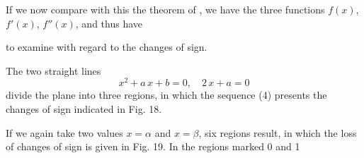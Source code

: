 If we now compare with this the theorem of , we have the three functions $f(x)$, $f'(x)$, $f''(x)$, and thus have


to examine with regard to the changes of sign.

The two straight lines
\[
x^2 + a\,x + b = 0,\quad 2\,x + a = 0
\]
divide the plane into three regions, in which the sequence (4) presents the changes of sign indicated in Fig. 18.


If we again take two values $x = \alpha$ and $x = \beta$, six regions result, in which the loss of changes of sign is given in Fig. 19. In the regions marked 0 and 1
